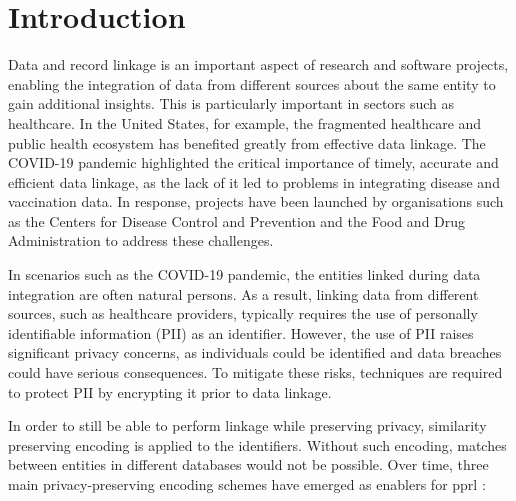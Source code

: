 
\chapter{Introduction}  \label{sec:introduction}
Data and record linkage is an important aspect of research and software projects, enabling the integration of data from different sources about the same entity to gain additional insights.
This is particularly important in sectors such as healthcare.
In the United States, for example, the fragmented healthcare and public health ecosystem has benefited greatly from effective data linkage.
The COVID-19 pandemic highlighted the critical importance of timely, accurate and efficient data linkage, as the lack of it led to problems in integrating disease and vaccination data.
In response, projects have been launched by organisations such as the Centers for Disease Control and Prevention and the Food and Drug Administration to address these challenges. \cite{pathak2024}

In scenarios such as the COVID-19 pandemic, the entities linked during data integration are often natural persons.
As a result, linking data from different sources, such as healthcare providers, typically requires the use of personally identifiable information (PII) as an identifier.
However, the use of PII raises significant privacy concerns, as individuals could be identified and data breaches could have serious consequences.
To mitigate these risks, techniques are required to protect PII by encrypting it prior to data linkage. \cite{pathak2024}

In order to still be able to perform linkage while preserving privacy, similarity preserving encoding is applied to the identifiers.
Without such encoding, matches between entities in different databases would not be possible.
Over time, three main privacy-preserving encoding schemes have emerged as enablers for \ac{pprl} \cite{pathak2024, schaefer2024}: 

